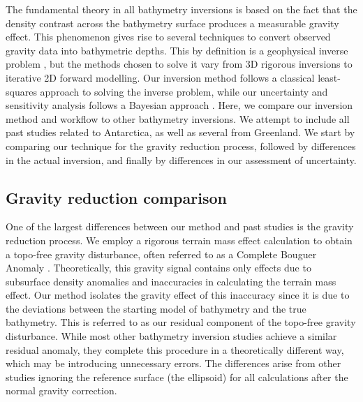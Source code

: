 The fundamental theory in all bathymetry inversions is based on the fact that the density contrast across the bathymetry surface produces a measurable gravity effect. This phenomenon gives rise to several techniques to convert observed gravity data into bathymetric depths. This by definition is a geophysical inverse problem \citep{oldenburginversion2005}, but the methods chosen to solve it vary from 3D rigorous inversions to iterative 2D forward modelling. Our inversion method follows a classical least-squares approach to solving the inverse problem, while our uncertainty and sensitivity analysis follows a Bayesian approach \citep{asterparameter2018}. Here, we compare our inversion method and workflow to other bathymetry inversions. We attempt to include all past studies related to Antarctica, as well as several from Greenland. We start by comparing our technique for the gravity reduction process, followed by differences in the actual inversion, and finally by differences in our assessment of uncertainty. \\

\subsection{Gravity reduction comparison}

One of the largest differences between our method and past studies is the gravity reduction process. We employ a rigorous terrain mass effect calculation to obtain a topo-free gravity disturbance, often referred to as a Complete Bouguer Anomaly \citep{vajdasecondary2007}. Theoretically, this gravity signal contains only effects due to subsurface density anomalies and inaccuracies in calculating the terrain mass effect. Our method isolates the gravity effect of this inaccuracy since it is due to the deviations between the starting model of bathymetry and the true bathymetry. This is referred to as our residual component of the topo-free gravity disturbance. While most other bathymetry inversion studies achieve a similar residual anomaly, they complete this procedure in a theoretically different way, which may be introducing unnecessary errors. The differences arise from other studies ignoring the reference surface (the ellipsoid) for all calculations after the normal gravity correction.\\


